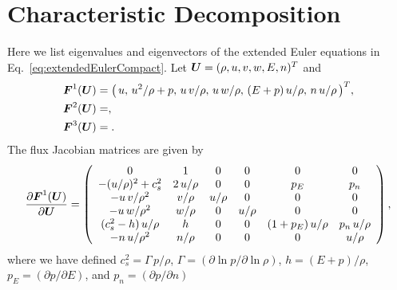 \documentclass[10pt,preprint]{aastex}
\begin{document}
\section{Characteristic Decomposition}
\label{app:Characteristic}

Here we list eigenvalues and eigenvectors of the extended Euler equations in Eq.~\eqref{eq:extendedEulerCompact}.  
Let $\boldsymbol{U}=(\rho,u,v,w,E,n)^{T}$ and 
\begin{align}
  \boldsymbol{F}^{1}(\boldsymbol{U})
  &=\big(\,u,\,u^{2}/\rho+p,\,u\,v/\rho,\,u\,w/\rho,\,(E+p)\,u/\rho,\,n\,u/\rho\,\big)^{T}, \\
  \boldsymbol{F}^{2}(\boldsymbol{U})
  &=, \\
  \boldsymbol{F}^{3}(\boldsymbol{U})
  &=.
\end{align}
The flux Jacobian matrices are given by
\begin{align}
  \frac{\partial \boldsymbol{F}^{1}(\boldsymbol{U})}{\partial \boldsymbol{U}}
  =
  \left(
  \begin{array}{cccccc}
  0 & 1 & 0 & 0 & 0 & 0 \\
  -(u/\rho)^{2}+c_{s}^{2} & 2\,u/\rho & 0 & 0 & p_{E} & p_{n} \\
  - u\,v/\rho^{2} & v/\rho & u/\rho & 0 & 0 & 0 \\
  - u\,w/\rho^{2} & w/\rho & 0 & u/\rho & 0 & 0 \\
  (c_{s}^{2}-h)\,u/\rho & h & 0 & 0 & (1+p_{E})\,u/\rho & p_{n}\,u/\rho \\
  -n\,u/\rho^{2} & n/\rho & 0 & 0 & 0 & u/\rho
  \end{array}
  \right),
\end{align}
where we have defined $c_{s}^{2}=\Gamma\,p/\rho$, $\Gamma=(\partial\ln p/\partial\ln \rho)$, $h=(E+p)/\rho$, $p_{E}=(\partial p/\partial E)$, and $p_{n}=(\partial p/\partial n)$
\end{document}
